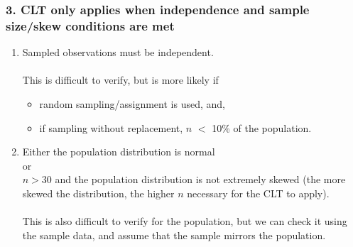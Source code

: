 \documentclass[slidestop,compress,mathserif,12pt,t,professionalfonts,xcolor=table]{beamer}
\begin{document}

\begin{frame}
\frametitle{3. CLT only applies when independence and sample size/skew conditions are met}

\begin{enumerate}

\item {} Sampled observations must be independent. \\

$\:$ \\
This is difficult to verify, but is more likely if
\begin{itemize}
\item random sampling/assignment is used, and,
\item if sampling without replacement, $n$ $<$ 10\% of the population.
\end{itemize}

\pause

\item {} Either the population distribution is normal \\
or\\
$n > 30$ and the population distribution is not extremely skewed (the more skewed the distribution, the higher $n$ necessary for the CLT to apply).\\
$\:$ \\
This is also difficult to verify for the population, but we can check it using the sample data, and assume that the sample mirrors the population.






\end{enumerate}


\end{frame}
\end{document}
